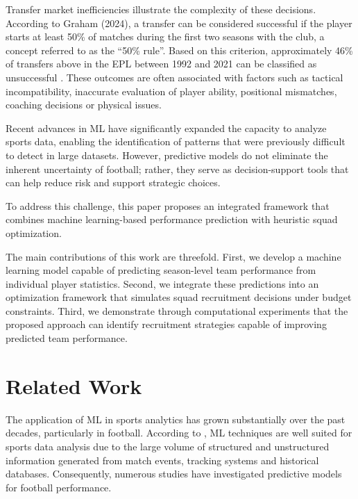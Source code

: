 \documentclass[12pt]{article}
\begin{document}
Transfer market inefficiencies illustrate the complexity of these decisions. According to Graham (2024), a transfer can be considered successful 
if the player starts at least 50\% of matches during the first two seasons with the club, a concept referred to as the ``50\% rule''. Based on this criterion, 
approximately 46\% of transfers above  in the EPL between 1992 and 2021 can be classified as unsuccessful \cite{Graham2024}. 
These outcomes are often associated with factors such as tactical incompatibility, inaccurate evaluation of player ability, positional mismatches, 
coaching decisions or physical issues.

Recent advances in ML have significantly expanded the capacity to analyze sports data, enabling the identification of patterns that were previously 
difficult to detect in large datasets. However, predictive models do not eliminate the inherent uncertainty of football; rather, they serve as decision-support 
tools that can help reduce risk and support strategic choices.

To address this challenge, this paper proposes an integrated framework that combines machine learning-based performance prediction with heuristic squad optimization.

The main contributions of this work are threefold. 
First, we develop a machine learning model capable of predicting season-level team performance from individual player statistics. 
Second, we integrate these predictions into an optimization framework that simulates squad recruitment decisions under budget constraints. 
Third, we demonstrate through computational experiments that the proposed approach can identify recruitment strategies capable of improving predicted team performance.

\section{Related Work}

The application of ML in sports analytics has grown substantially over the past decades, particularly in football. 
According to \cite{Horvat2020}, ML techniques are well suited for sports data analysis due to the large volume of structured and unstructured information 
generated from match events, tracking systems and historical databases. Consequently, numerous studies have investigated predictive models for football performance.
\end{document}
